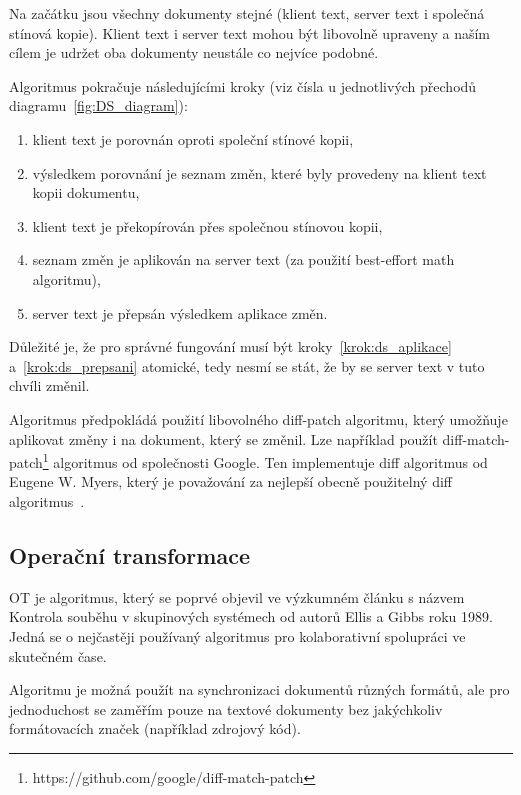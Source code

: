 Na začátku jsou všechny dokumenty stejné (klient text, server text i společná stínová kopie).
Klient text i server text mohou být libovolně upraveny a naším cílem je udržet oba dokumenty neustále co nejvíce podobné.

Algoritmus pokračuje následujícími kroky (viz čísla u jednotlivých přechodů diagramu~\ref{fig:DS_diagram}):
\begin{enumerate}
    \item klient text je porovnán oproti společní stínové kopii,
    \item výsledkem porovnání je seznam změn, které byly provedeny na klient text kopii dokumentu,
    \item klient text je překopírován přes společnou stínovou kopii,
    \item seznam změn je aplikován na server text (za použití best-effort math algoritmu),\label{krok:ds_aplikace}
    \item server text je přepsán výsledkem aplikace změn.\label{krok:ds_prepsani}
\end{enumerate}

Důležité je, že pro správné fungování musí být kroky~\ref{krok:ds_aplikace} a~\ref{krok:ds_prepsani} atomické, tedy nesmí se stát, že by se server text v tuto chvíli změnil.

Algoritmus předpokládá použití libovolného diff-patch algoritmu, který umožňuje aplikovat změny i na dokument, který se změnil.
Lze například použít diff-match-patch\footnote{https://github.com/google/diff-match-patch} algoritmus od společnosti Google.
Ten implementuje diff algoritmus od Eugene W. Myers, který je považování za nejlepší obecně použitelný diff algoritmus~\cite{ds:myers_diff}.~\cite{ds:neil_paper, ds:neil_video}

\subsection{Operační transformace}\label{subsec:operacniTransformace}

\gls{OT} je algoritmus, který se poprvé objevil ve výzkumném článku s názvem Kontrola souběhu v skupinových systémech od autorů Ellis a Gibbs roku 1989.
Jedná se o nejčastěji používaný algoritmus pro kolaborativní spolupráci ve skutečném čase.~\cite{ot:intro}

Algoritmu je možná použít na synchronizaci dokumentů různých formátů, ale pro jednoduchost se zaměřím pouze na textové dokumenty bez jakýchkoliv formátovacích značek (například zdrojový kód).


